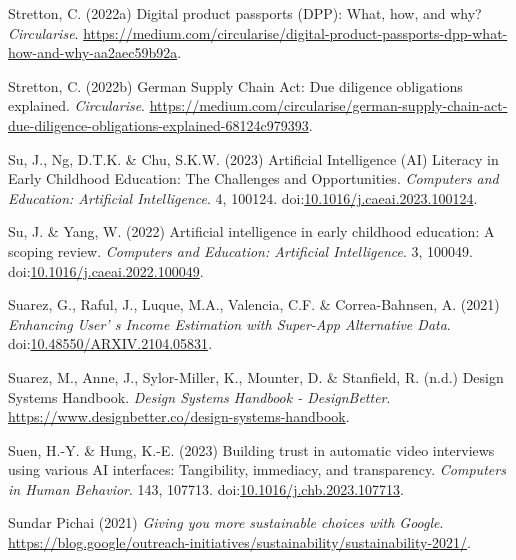 \documentclass[
  letterpaper,
  DIV=11,
  numbers=noendperiod]{scrartcl}
\newlength{\cslhangindent}
\newenvironment{CSLReferences}[2] %
 {\begin{list}{}{%
  \setlength{\itemindent}{0pt}
  \setlength{\leftmargin}{0pt}
  \setlength{\parsep}{0pt}
  \ifodd #1
   \setlength{\leftmargin}{\cslhangindent}
   \setlength{\itemindent}{-1\cslhangindent}
  \fi
  \setlength{\itemsep}{#2\baselineskip}}}
 {\end{list}}
\begin{document}
\begin{CSLReferences}{0}{1}
Stretton, C. (2022a) Digital product passports ({DPP}): What, how, and
why? \emph{Circularise}.
\url{https://medium.com/circularise/digital-product-passports-dpp-what-how-and-why-aa2aec59b92a}.

Stretton, C. (2022b) German {Supply Chain Act}: {Due} diligence
obligations explained. \emph{Circularise}.
\url{https://medium.com/circularise/german-supply-chain-act-due-diligence-obligations-explained-68124c979393}.

Su, J., Ng, D.T.K. \& Chu, S.K.W. (2023) Artificial {Intelligence}
({AI}) {Literacy} in {Early Childhood Education}: {The Challenges} and
{Opportunities}. \emph{Computers and Education: Artificial
Intelligence}. 4, 100124.
doi:\href{https://doi.org/10.1016/j.caeai.2023.100124}{10.1016/j.caeai.2023.100124}.

Su, J. \& Yang, W. (2022) Artificial intelligence in early childhood
education: {A} scoping review. \emph{Computers and Education: Artificial
Intelligence}. 3, 100049.
doi:\href{https://doi.org/10.1016/j.caeai.2022.100049}{10.1016/j.caeai.2022.100049}.

Suarez, G., Raful, J., Luque, M.A., Valencia, C.F. \& Correa-Bahnsen, A.
(2021) \emph{Enhancing {User}' s {Income Estimation} with {Super-App
Alternative Data}}.
doi:\href{https://doi.org/10.48550/ARXIV.2104.05831}{10.48550/ARXIV.2104.05831}.

Suarez, M., Anne, J., Sylor-Miller, K., Mounter, D. \& Stanfield, R.
(n.d.) Design {Systems Handbook}. \emph{Design Systems Handbook -
DesignBetter}.
\url{https://www.designbetter.co/design-systems-handbook}.

Suen, H.-Y. \& Hung, K.-E. (2023) Building trust in automatic video
interviews using various {AI} interfaces: {Tangibility}, immediacy, and
transparency. \emph{Computers in Human Behavior}. 143, 107713.
doi:\href{https://doi.org/10.1016/j.chb.2023.107713}{10.1016/j.chb.2023.107713}.

Sundar Pichai (2021) \emph{Giving you more sustainable choices with
{Google}}.
\url{https://blog.google/outreach-initiatives/sustainability/sustainability-2021/}.


\end{CSLReferences}
\end{document}
